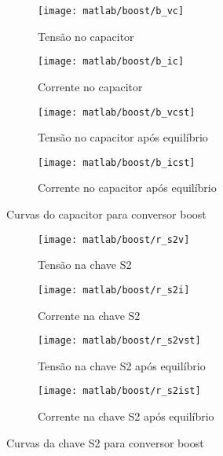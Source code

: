 \documentclass{article}
\begin{document}
\begin{figure}[H]
	\centering
	\begin{subfigure}[b]{0.4\linewidth}
		\texttt{[image: matlab/boost/b\_vc]}
		\caption{Tensão no capacitor}
	\end{subfigure}
	\begin{subfigure}[b]{0.4\linewidth}
		\centering
		\texttt{[image: matlab/boost/b\_ic]}
		\caption{Corrente no capacitor}
	\end{subfigure}
	\begin{subfigure}[b]{0.4\linewidth}
		\texttt{[image: matlab/boost/b\_vcst]}
		\caption{Tensão no capacitor após equilíbrio}
	\end{subfigure}
	\begin{subfigure}[b]{0.4\linewidth}
		\centering
		\texttt{[image: matlab/boost/b\_icst]}
		\caption{Corrente no capacitor após equilíbrio}
	\end{subfigure}
	\caption{Curvas do capacitor para conversor boost}
	\label{fig:boc}
\end{figure}
\begin{figure}[H]
	\centering
	\begin{subfigure}[b]{0.4\linewidth}
		\texttt{[image: matlab/boost/r\_s2v]}
		\caption{Tensão na chave S2}
	\end{subfigure}
	\begin{subfigure}[b]{0.4\linewidth}
		\centering
		\texttt{[image: matlab/boost/r\_s2i]}
		\caption{Corrente na chave S2}
	\end{subfigure}
	\begin{subfigure}[b]{0.4\linewidth}
		\texttt{[image: matlab/boost/r\_s2vst]}
		\caption{Tensão na chave S2 após equilíbrio}
	\end{subfigure}
	\begin{subfigure}[b]{0.4\linewidth}
		\centering
		\texttt{[image: matlab/boost/r\_s2ist]}
		\caption{Corrente na chave S2 após equilíbrio}
	\end{subfigure}
	\caption{Curvas da chave S2 para conversor boost}
	\label{fig:bos2}
\end{figure}
\end{document}
